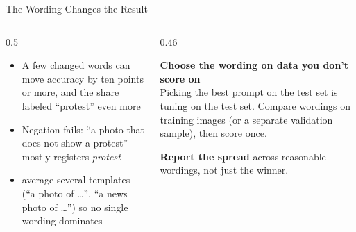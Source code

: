 \begin{frame}{The Wording Changes the Result}
\begin{columns}[T]
\begin{column}{0.5\textwidth}
\begin{itemize}
\item A few changed words can move accuracy by ten points or more, and the share labeled
      ``protest'' even more
\item Negation fails: ``a photo that does not show a protest'' mostly registers \emph{protest}
\item {} average several templates (``a photo of \ldots'', ``a news photo
      of \ldots'') so no single wording dominates
\end{itemize}
\end{column}
\begin{column}{0.46\textwidth}
\begin{greenbox}
\textbf{Choose the wording on data you don't score on}\\
Picking the best prompt on the test set is tuning on the test set. Compare wordings on training
images (or a separate validation sample), then score once.
\end{greenbox}
\begin{graybox}
\textbf{Report the spread} across reasonable wordings, not just the winner.
\end{graybox}
\end{column}
\end{columns}
\end{frame}


